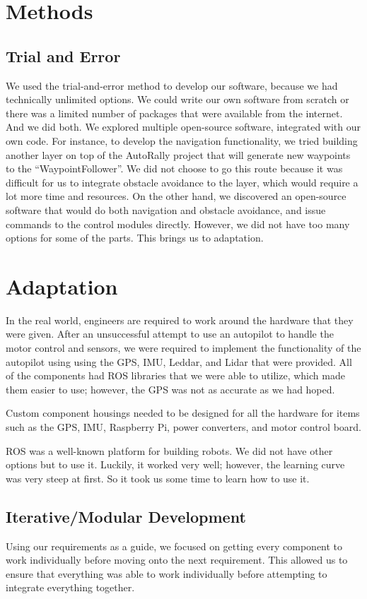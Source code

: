 \documentclass[compsoc,draftclsnofoot,onecolumn,10pt]{IEEEtran}
\begin{document}
\section{Methods}
\subsection{Trial and Error}
We used the trial-and-error method to develop our software, because we had technically unlimited options. We could write our own software from scratch or there was a limited number of packages that were available from the internet. And we did both. We explored multiple open-source software, integrated with our own code. 
For instance, to develop the navigation functionality, we tried building another layer on top of the AutoRally project that will generate new waypoints to the “WaypointFollower”. We did not choose to go this route because it was difficult for us to integrate obstacle avoidance to the layer, which would require a lot more time and resources. On the other hand, we discovered an open-source software that would do both navigation and obstacle avoidance, and issue commands to the control modules directly. 
However, we did not have too many options for some of the parts. This brings us to adaptation.

\section{Adaptation}
In the real world, engineers are required to work around the hardware that they were given. 
After an unsuccessful attempt to use an autopilot to handle the motor control and sensors, we were required to implement the functionality of the autopilot using using the GPS, IMU, Leddar, and Lidar that were provided. 
All of the components had ROS libraries that we were able to utilize, which made them easier to use; however, the GPS was not as accurate as we had hoped. 

Custom component housings needed to be designed for all the hardware for items such as the GPS, IMU, Raspberry Pi, power converters, and motor control board. 

ROS was a well-known platform for building robots. We did not have other options but to use it. Luckily, it worked very well; however, the learning curve was very steep at first. So it took us some time to learn how to use it. 

\subsection{Iterative/Modular Development}
Using our requirements as a guide, we focused on getting every component to work individually before moving onto the next requirement. This allowed us to ensure that everything was able to work individually before attempting to integrate everything together. 
\end{document}
